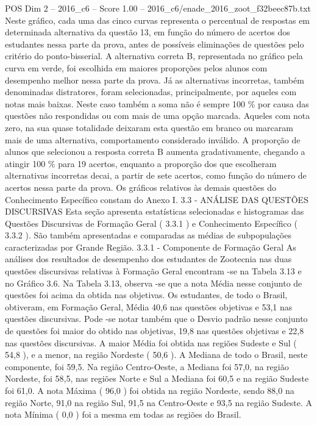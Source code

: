 \begin{textsample}{POS Dim 2 – 2016\_c6 – Score 1.00 – 2016\_c6/enade\_2016\_zoot\_f32beec87b.txt}
Neste gráfico, cada uma das cinco curvas representa o percentual de respostas em determinada alternativa da questão 13, em função do número de acertos dos estudantes nessa parte da prova, antes de possíveis eliminações de questões pelo critério do ponto-bisserial.
A alternativa correta B, representada no gráfico pela curva em verde, foi escolhida em maiores proporções pelos alunos com desempenho melhor nessa parte da prova.
Já as alternativas incorretas, também denominadas distratores, foram selecionadas, principalmente, por aqueles com notas mais baixas.
Neste caso também a soma não é sempre 100 \% por causa das questões não respondidas ou com mais de uma opção marcada.
Aqueles com nota zero, na sua quase totalidade deixaram esta questão em branco ou marcaram mais de uma alternativa, comportamento considerado inválido.
A proporção de alunos que selecionou a resposta correta B aumenta gradativamente, chegando a atingir 100 \% para 19 acertos, enquanto a proporção dos que escolheram alternativas incorretas decai, a partir de sete acertos, como função do número de acertos nessa parte da prova.
Os gráficos relativos às demais questões do Conhecimento Específico constam do Anexo I. 3.3 - ANÁLISE DAS QUESTÕES DISCURSIVAS Esta seção apresenta estatísticas selecionadas e histogramas das Questões Discursivas de Formação Geral ( 3.3.1 ) e Conhecimento Específico ( 3.3.2 ).
São também apresentadas e comparadas as médias de subpopulações caracterizadas por Grande Região. 3.3.1 - Componente de Formação Geral As análises dos resultados de desempenho dos estudantes de Zootecnia nas duas questões discursivas relativas à Formação Geral encontram -se na Tabela 3.13 e no Gráfico 3.6.
Na Tabela 3.13, observa -se que a nota Média nesse conjunto de questões foi acima da obtida nas objetivas.
Os estudantes, de todo o Brasil, obtiveram, em Formação Geral, Média 40,6 nas questões objetivas e 53,1 nas questões discursivas.
Pode -se notar também que o Desvio padrão nesse conjunto de questões foi maior do obtido nas objetivas, 19,8 nas questões objetivas e 22,8 nas questões discursivas.
A maior Média foi obtida nas regiões Sudeste e Sul ( 54,8 ), e a menor, na região Nordeste ( 50,6 ).
A Mediana de todo o Brasil, neste componente, foi 59,5.
Na região Centro-Oeste, a Mediana foi 57,0, na região Nordeste, foi 58,5, nas regiões Norte e Sul a Mediana foi 60,5 e na região Sudeste foi 61,0.
A nota Máxima ( 96,0 ) foi obtida na região Nordeste, sendo 88,0 na região Norte, 91,0 na região Sul, 91,5 na Centro-Oeste e 93,5 na região Sudeste.
A nota Mínima ( 0,0 ) foi a mesma em todas as regiões do Brasil.

\end{textsample}
